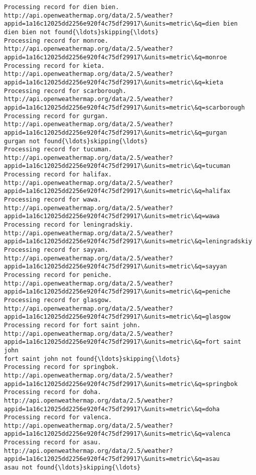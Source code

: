 \documentclass[11pt]{article}
\begin{document}
\begin{Verbatim}[commandchars=\\\{\}]
Processing record for dien bien.
http://api.openweathermap.org/data/2.5/weather?appid=1a16c12025dd2256e920f4c75df29917\&units=metric\&q=dien bien
dien bien not found{\ldots}skipping{\ldots}
Processing record for monroe.
http://api.openweathermap.org/data/2.5/weather?appid=1a16c12025dd2256e920f4c75df29917\&units=metric\&q=monroe
Processing record for kieta.
http://api.openweathermap.org/data/2.5/weather?appid=1a16c12025dd2256e920f4c75df29917\&units=metric\&q=kieta
Processing record for scarborough.
http://api.openweathermap.org/data/2.5/weather?appid=1a16c12025dd2256e920f4c75df29917\&units=metric\&q=scarborough
Processing record for gurgan.
http://api.openweathermap.org/data/2.5/weather?appid=1a16c12025dd2256e920f4c75df29917\&units=metric\&q=gurgan
gurgan not found{\ldots}skipping{\ldots}
Processing record for tucuman.
http://api.openweathermap.org/data/2.5/weather?appid=1a16c12025dd2256e920f4c75df29917\&units=metric\&q=tucuman
Processing record for halifax.
http://api.openweathermap.org/data/2.5/weather?appid=1a16c12025dd2256e920f4c75df29917\&units=metric\&q=halifax
Processing record for wawa.
http://api.openweathermap.org/data/2.5/weather?appid=1a16c12025dd2256e920f4c75df29917\&units=metric\&q=wawa
Processing record for leningradskiy.
http://api.openweathermap.org/data/2.5/weather?appid=1a16c12025dd2256e920f4c75df29917\&units=metric\&q=leningradskiy
Processing record for sayyan.
http://api.openweathermap.org/data/2.5/weather?appid=1a16c12025dd2256e920f4c75df29917\&units=metric\&q=sayyan
Processing record for peniche.
http://api.openweathermap.org/data/2.5/weather?appid=1a16c12025dd2256e920f4c75df29917\&units=metric\&q=peniche
Processing record for glasgow.
http://api.openweathermap.org/data/2.5/weather?appid=1a16c12025dd2256e920f4c75df29917\&units=metric\&q=glasgow
Processing record for fort saint john.
http://api.openweathermap.org/data/2.5/weather?appid=1a16c12025dd2256e920f4c75df29917\&units=metric\&q=fort saint john
fort saint john not found{\ldots}skipping{\ldots}
Processing record for springbok.
http://api.openweathermap.org/data/2.5/weather?appid=1a16c12025dd2256e920f4c75df29917\&units=metric\&q=springbok
Processing record for doha.
http://api.openweathermap.org/data/2.5/weather?appid=1a16c12025dd2256e920f4c75df29917\&units=metric\&q=doha
Processing record for valenca.
http://api.openweathermap.org/data/2.5/weather?appid=1a16c12025dd2256e920f4c75df29917\&units=metric\&q=valenca
Processing record for asau.
http://api.openweathermap.org/data/2.5/weather?appid=1a16c12025dd2256e920f4c75df29917\&units=metric\&q=asau
asau not found{\ldots}skipping{\ldots}

\end{Verbatim}
\end{document}
